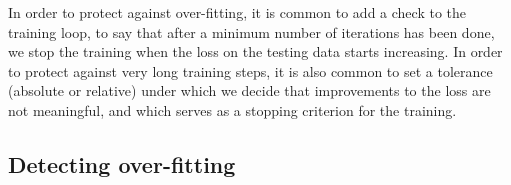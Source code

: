 \documentclass[
  letterpaper,
]{scrbook}
\begin{document}
\begin{table}

\caption{\label{tbl-gradient-attempt-one}This table shows the change in
the model, as measured by the loss and by the estimates of the
parameters, after an increasing amount of training epochs. The loss
drops sharply in the first 500 iterations, but even after 20000
iterations, there are still some changes in the values of the
parameters.}


\end{table}%

In order to protect against over-fitting, it is common to add a check to
the training loop, to say that after a minimum number of iterations has
been done, we stop the training when the loss on the testing data starts
increasing. In order to protect against very long training steps, it is
also common to set a tolerance (absolute or relative) under which we
decide that improvements to the loss are not meaningful, and which
serves as a stopping criterion for the training.

\subsection{Detecting
over-fitting}\label{sec-gradientdescent-overfitting}
\end{document}
